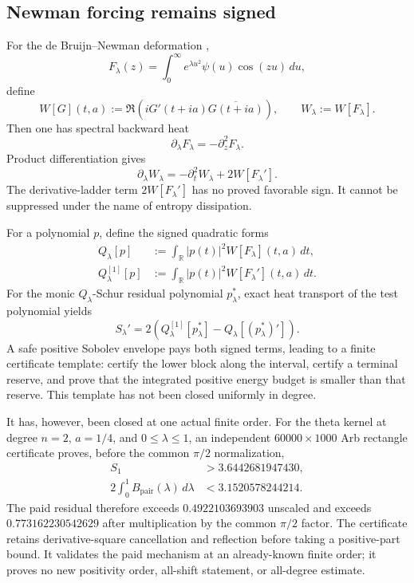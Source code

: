 \documentclass[11pt]{article}
\theoremstyle{definition}
\theoremstyle{remark}
\newcommand{\R}{\mathbb{R}}
\begin{document}
\subsection{Newman forcing remains signed}

For the de Bruijn--Newman deformation \cite{RodgersTao2020},
\begin{equation}
 F_\lambda(z)=\int_0^\infty e^{\lambda u^2}\psi(u)\cos(zu)\,du,
\end{equation}
define
\begin{equation}
 W[G](t,a):=\Re\!\left(iG'(t+ia)\overline{G(t+ia)}\right),
 \qquad W_\lambda:=W[F_\lambda].
\end{equation}
Then one has spectral backward heat
\begin{equation}
 \partial_\lambda F_\lambda=-\partial_z^2F_\lambda.
\end{equation}
Product differentiation gives
\begin{equation}
 \partial_\lambda W_\lambda
 =-\partial_t^2W_\lambda+2W[F_\lambda'].
 \label{eq:newman-forcing}
\end{equation}
The derivative-ladder term $2W[F_\lambda']$ has no proved favorable sign.
It cannot be suppressed under the name of entropy dissipation.

For a polynomial $p$, define the signed quadratic forms
\begin{align}
 Q_\lambda[p]&:=\int_\R |p(t)|^2W[F_\lambda](t,a)\,dt,\\
 Q_\lambda^{[1]}[p]&:=\int_\R |p(t)|^2W[F_\lambda'](t,a)\,dt.
\end{align}
For the monic $Q_\lambda$-Schur residual polynomial $p_\lambda^*$, exact heat
transport of the test polynomial yields
\begin{equation}
 S_\lambda'=2\left(
 Q_\lambda^{[1]}[p_\lambda^*]
 -Q_\lambda[(p_\lambda^*)']\right).
 \label{eq:schur-flow}
\end{equation}
A safe positive Sobolev envelope pays both signed terms, leading to a finite
certificate template: certify the lower block along the interval, certify a
terminal reserve, and prove that the integrated positive energy budget is
smaller than that reserve. This template has not been closed uniformly in
degree.

It has, however, been closed at one actual finite order. For the theta kernel
at degree $n=2$, $a=1/4$, and $0\le\lambda\le1$, an independent
$60000\times1000$ Arb rectangle certificate proves, before the common
$\pi/2$ normalization,
\begin{align}
 S_1&>3.6442681947430,\nonumber\\
 2\int_0^1 B_{\mathrm{pair}}(\lambda)\,d\lambda
   &<3.1520578244214.
 \label{eq:paid-newman-n2}
\end{align}
The paid residual therefore exceeds $0.4922103693903$ unscaled and exceeds
$0.773162230542629$ after multiplication by the common $\pi/2$ factor. The
certificate retains derivative-square cancellation and reflection before
taking a positive-part bound. It validates the paid mechanism at an
already-known finite order; it proves no new positivity order, all-shift
statement, or all-degree estimate.
\end{document}
